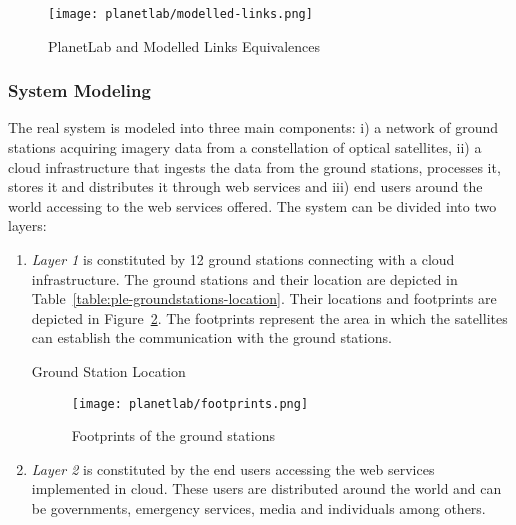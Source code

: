 \begin{figure}[!h]
\begin{center}
\texttt{[image: planetlab/modelled-links.png]}
\caption{PlanetLab and Modelled Links Equivalences}
\label{fig:ple-modelled-links}
\end{center}
\end{figure}


\subsubsection{System Modeling}

The real system is modeled into three main components: i) a network of ground stations acquiring imagery data from a constellation of optical satellites, ii) a cloud infrastructure that ingests the data from the ground stations, processes it, stores it and distributes it through web services and iii) end users around the world accessing to the web services offered. The system can be divided into two layers:

\begin{enumerate}

\item \emph{Layer 1} is constituted by 12 ground stations connecting with a cloud
  infrastructure. The ground stations and their location are depicted in Table~\ref{table:ple-groundstations-location}. Their locations and footprints are depicted in Figure~\ref{fig:ple-footprints}. The footprints represent the area in which the satellites can establish the communication with the ground stations.

\begin{table}[hp]
  \centering
  {\small
  
  }
  \caption{Ground Station Location}
  \label{table:ple-groundstations-location}
\end{table}

\begin{figure}[!h]
\begin{center}
\texttt{[image: planetlab/footprints.png]}

\caption{Footprints of the ground stations}
\label{fig:ple-footprints}
\end{center}
\end{figure}


\item \emph{Layer 2} is constituted by the end users accessing the web services
  implemented in cloud. These users are distributed around the world and can be
  governments, emergency services, media and individuals among others.
\end{enumerate}

